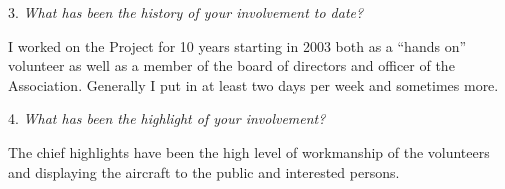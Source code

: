 \begin{multicols}{2}

3. \textit{What has been the history of your involvement to date?}

I worked on the Project for 10 years starting in 2003 both as a “hands
on” volunteer as well as a member of the board of directors and officer
of the Association. Generally I put in at least two days per week and
sometimes more. 



4. \textit{What has been the highlight of your involvement?}

The chief highlights have been the high level of workmanship of the
volunteers and displaying the aircraft to the public and interested
persons.



\end{multicols}
